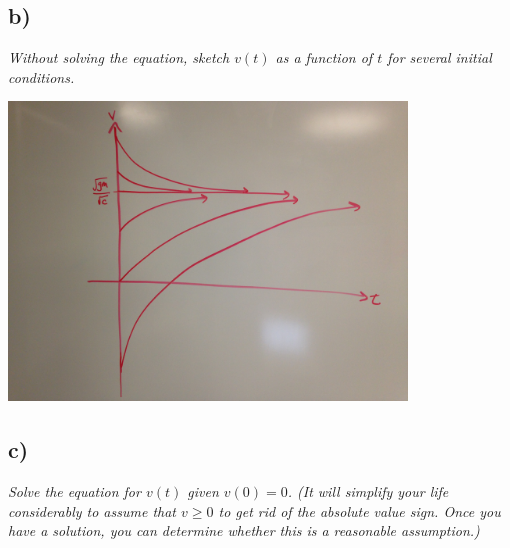 \documentclass[12pt]{article}
\begin{document}
\subsection*{ b)}
{\it Without solving the equation, sketch $v(t)$ as a function of $t$ for several initial conditions.}

\begin{center}
	\includegraphics[width=400px]{figures/3_b.jpg}
\end{center}

\subsection*{ c)}
{\it Solve the equation for $v(t)$ given $v(0) = 0$.  (It will simplify your life considerably to assume that $v \geq 0$ to get rid of the absolute value sign.  Once you have a solution, you can determine whether this is a reasonable assumption.)} \\
\end{document}
